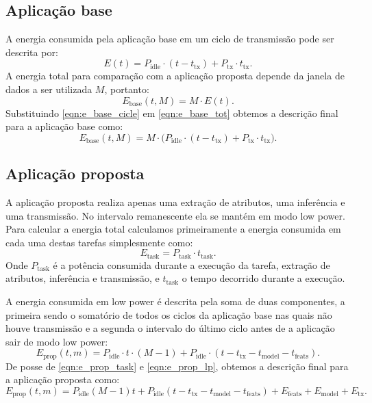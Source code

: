 \documentclass[a5paper]{ufsc-thesis}  %
\begin{document}
\subsection{Aplicação base}
A energia consumida pela aplicação base em um ciclo de transmissão pode ser descrita por: 
\begin{equation}
    E(t) = P_{\text{idle}} \cdot (t - t_{\text{tx}}) + P_{\text{tx}} \cdot t_{\text{tx}}.
    \label{eqn:e_base_cicle}
\end{equation}
A energia total para comparação com a aplicação proposta depende da janela de dados a ser utilizada $M$, portanto:
\begin{equation}
    E_{\text{base}}(t, M) = M \cdot E(t).
    \label{eqn:e_base_tot}
\end{equation}
Substituindo \ref{eqn:e_base_cicle} em \ref{eqn:e_base_tot} obtemos a descrição final para a aplicação base como:
\begin{equation}
    E_{\text{base}}(t, M) = M \cdot \big( P_{\text{idle}} \cdot (t - t_{\text{tx}}) + P_{\text{tx}} \cdot t_{\text{tx}} \big) .
\end{equation}

\subsection{Aplicação proposta}
A aplicação proposta realiza apenas uma extração de atributos, uma inferência e uma transmissão. No intervalo remanescente ela se mantém em modo low power. Para calcular a energia total calculamos primeiramente a energia consumida em cada uma destas tarefas simplesmente como:
\begin{equation}
    E_{\text{task}} = P_{\text{task}} \cdot t_{\text{task}}.
    \label{eqn:e_prop_task}
\end{equation}
Onde $P_{\text{task}}$ é a potência consumida durante a execução da tarefa, extração de atributos, inferência e transmissão, e $t_{\text{task}}$ o tempo decorrido durante a execução.

A energia consumida em low power é descrita pela soma de duas componentes, a primeira sendo o somatório de todos os ciclos da aplicação base nas quais não houve transmissão e a segunda o intervalo do último ciclo antes de a aplicação sair de modo low power:
\begin{equation}
    E_{\text{prop}}(t, m) = P_{\text{idle}} \cdot t \cdot (M-1) + P_{\text{idle}} \cdot (t - t_{\text{tx}} - t_{\text{model}} - t_{\text{feats}}).
    \label{eqn:e_prop_lp}
\end{equation}
De posse de \ref{eqn:e_prop_task} e \ref{eqn:e_prop_lp}, obtemos a descrição final para a aplicação proposta como:
\begin{equation}
    E_{\text{prop}}(t, m) = P_{\text{idle}} (M-1) t + P_{\text{idle}} (t - t_{\text{tx}} - t_{\text{model}} - t_{\text{feats}}) + E_{\text{feats}} + E_{\text{model}} + E_{\text{tx}}.
\end{equation}
\end{document}
